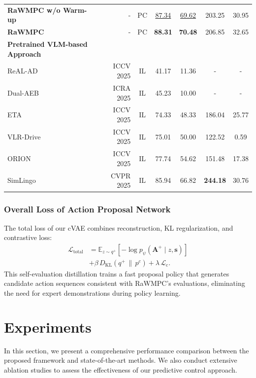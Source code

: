 \documentclass[twocolumn]{template}
\theoremstyle{thmstyleone}%
\theoremstyle{thmstyletwo}%
\theoremstyle{thmstylethree}%
\begin{document}
\begin{table}[t]
{\begin{tabular}{lr|c|>{\columncolor{pink!20}}cccc}
\textbf{RaWMPC w/o Warm-up} & - & PC & \underline{87.34} & \underline{69.62} & 203.25 & 30.95 \\
\textbf{RaWMPC} & - & PC & \textbf{88.31} & \textbf{70.48} & 206.85 & 32.65 \\
\midrule
\textbf{Pretrained VLM-based Approach} \\
ReAL-AD~\cite{ReAL-AD} & ICCV 2025 & IL & 41.17 & 11.36 & - & - \\
Dual-AEB~\cite{Dual-AEB} & ICRA 2025 & IL & 45.23 & 10.00 & - & - \\
ETA~\cite{Eta} & ICCV 2025 & IL & 74.33 & 48.33 & 186.04 & 25.77 \\
VLR-Drive~\cite{VLR-Drive} & ICCV 2025 & IL & 75.01 & 50.00 & 122.52 & 0.59 \\
ORION~\cite{Orion} & ICCV 2025 & IL & 77.74 & 54.62 & 151.48 & 17.38 \\
SimLingo~\cite{Simlingo} & CVPR 2025 & IL & 85.94 & 66.82 & \textbf{244.18} & 30.76 \\
\bottomrule
\end{tabular}}
\label{tab:bench2drive_closedloop}
\end{table}

\subsubsection{Overall Loss of Action Proposal Network}
The total loss of our cVAE combines reconstruction, KL regularization, and contrastive loss:
\begin{equation}
\begin{aligned}
\mathcal{L}_{\text{total}} &= \mathbb{E}_{z\sim q^{+}}\!\left[-\log p_\psi(\mathbf{A}^{+}\mid z,\mathbf{s})\right] \\
& + \beta\, D_{\text{KL}}\!\left(q^{+}\,\|\,p^{c}\right)
+\lambda\,\mathcal{L}_{\text{c}} .
\end{aligned}
\end{equation}
This self-evaluation distillation trains a fast proposal policy that generates candidate action sequences consistent with RaWMPC's evaluations, eliminating the need for expert demonstrations during policy learning.

\section{Experiments}
In this section, we present a comprehensive performance comparison between the proposed framework and state-of-the-art methods. We also conduct extensive ablation studies to assess the effectiveness of our predictive control approach.
\end{document}
